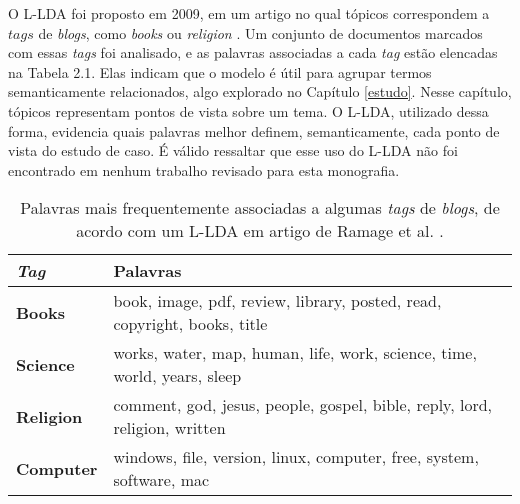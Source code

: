 

O L-LDA foi proposto em 2009, em um artigo no qual tópicos correspondem a \ensuremath{tags} de \emph{blogs}, como \emph{books} ou \emph{religion} \cite{llda}. Um conjunto de documentos marcados com essas \emph{tags} foi analisado, e as palavras associadas a cada \emph{tag} estão elencadas na Tabela 2.1. Elas indicam que o modelo é útil para agrupar termos semanticamente relacionados, algo explorado no Capítulo \ref{estudo}. Nesse capítulo, tópicos representam pontos de vista sobre um tema. O L-LDA, utilizado dessa forma, evidencia quais palavras melhor definem, semanticamente, cada ponto de vista do estudo de caso. É válido ressaltar que esse uso do L-LDA não foi encontrado em nenhum trabalho revisado para esta monografia. 

\begin{table}[h]
\centering
\begin{tabular}{| l | p{10cm} | }
\hline

\textbf{\emph{Tag}} & \textbf{Palavras} \\ \hline

\textbf{Books} & book, image, pdf, review, library, posted, read, copyright, books, title \\ \hline
\textbf{Science} & works, water, map, human, life, work, science, time, world, years, sleep   \\ \hline
\textbf{Religion} & comment, god, jesus, people, gospel, bible, reply, lord, religion, written  \\ \hline
\textbf{Computer} & windows, file, version, linux, computer, free, system, software, mac  \\ \hline
\end{tabular}
\label{l-lda}
\caption{Palavras mais frequentemente associadas a algumas \emph{tags} de \emph{blogs}, de acordo com um L-LDA em artigo de Ramage et al. \cite{llda}. }
\end{table}


